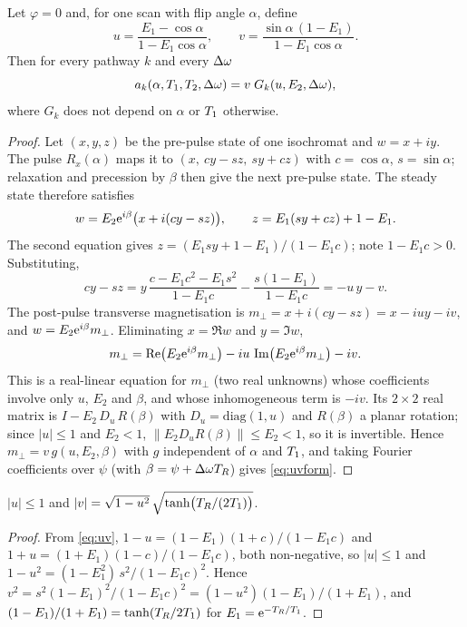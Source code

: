 \begin{theorem}\label{thm:uv}
Let $\varphi=0$ and, for one scan with flip angle $\alpha$, define
\begin{equation}
  u=\frac{E_1-\cos\alpha}{1-E_1\cos\alpha},\qquad
  v=\frac{\sin\alpha\,(1-E_1)}{1-E_1\cos\alpha}.
  \label{eq:uv}
\end{equation}
Then for every pathway $k$ and every $\Delta\omega$
\begin{equation}
  a_k(\alpha,T_1,T_2,\Delta\omega)=v\;G_k(u,E_2,\Delta\omega),
  \label{eq:uvform}
\end{equation}
where $G_k$ does not depend on $\alpha$ or $T_1$ otherwise.
\end{theorem}
\begin{proof}
Let $(x,y,z)$ be the pre-pulse state of one isochromat and $w=x+iy$. The pulse $R_x(\alpha)$
maps it to $(x,\ cy-sz,\ sy+cz)$ with $c=\cos\alpha$, $s=\sin\alpha$; relaxation and precession by
$\beta$ then give the next pre-pulse state. The steady state therefore satisfies
\begin{equation}
  w=E_2\mathrm{e}^{i\beta}\bigl(x+i(cy-sz)\bigr),\qquad z=E_1(sy+cz)+1-E_1 .
  \label{eq:steady2}
\end{equation}
The second equation gives $z=(E_1sy+1-E_1)/(1-E_1c)$; note $1-E_1c>0$. Substituting,
\[
  cy-sz=y\,\frac{c-E_1c^2-E_1s^2}{1-E_1c}-\frac{s(1-E_1)}{1-E_1c}=-u\,y-v .
\]
The post-pulse transverse magnetisation is $m_\perp=x+i(cy-sz)=x-iuy-iv$, and $w=E_2\mathrm{e}^{i\beta}m_\perp$.
Eliminating $x=\Re w$ and $y=\Im w$,
\begin{equation}
  m_\perp=\operatorname{Re}\bigl(E_2\mathrm{e}^{i\beta}m_\perp\bigr)-iu\,\operatorname{Im}\bigl(E_2\mathrm{e}^{i\beta}m_\perp\bigr)-iv .
  \label{eq:mperp_lin}
\end{equation}
This is a real-linear equation for $m_\perp$ (two real unknowns) whose coefficients involve only
$u$, $E_2$ and $\beta$, and whose inhomogeneous term is $-iv$. Its $2\times2$ real matrix is
$I-E_2\,D_u\,R(\beta)$ with $D_u=\mathrm{diag}(1,u)$ and $R(\beta)$ a planar rotation; since
$|u|\le1$ and $E_2<1$, $\|E_2D_uR(\beta)\|\le E_2<1$, so it is invertible. Hence
$m_\perp=v\,g(u,E_2,\beta)$ with $g$ independent of $\alpha$ and $T_1$, and taking Fourier
coefficients over $\psi$ (with $\beta=\psi+\Delta\omega T_R$) gives \eqref{eq:uvform}.
\end{proof}

\begin{lemma}\label{lem:absv}
$|u|\le1$ and $|v|=\sqrt{1-u^2}\,\sqrt{\tanh\bigl(T_R/(2T_1)\bigr)}$.
\end{lemma}
\begin{proof}
From \eqref{eq:uv}, $1-u=(1-E_1)(1+c)/(1-E_1c)$ and $1+u=(1+E_1)(1-c)/(1-E_1c)$, both
non-negative, so $|u|\le1$ and $1-u^2=(1-E_1^2)\,s^2/(1-E_1c)^2$. Hence
$v^2=s^2(1-E_1)^2/(1-E_1c)^2=(1-u^2)(1-E_1)/(1+E_1)$, and $(1-E_1)/(1+E_1)=\tanh(T_R/2T_1)$ for
$E_1=\mathrm{e}^{-T_R/T_1}$.
\end{proof}

